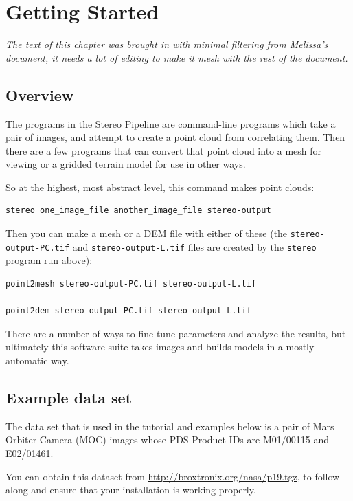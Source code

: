 \chapter{Getting Started}

\emph{The text of this chapter was brought in with minimal filtering from Melissa's document, it needs a lot of editing to make it mesh with the rest of the document.}

\section{Overview}

The programs in the Stereo Pipeline are command-line programs which
take a pair of images, and attempt to create a point cloud from
correlating them.  Then there are a few programs that can convert
that point cloud into a mesh for viewing or a gridded terrain model
for use in other ways.

So at the highest, most abstract level, this command makes point clouds:

\begin{verbatim}
stereo one_image_file another_image_file stereo-output
\end{verbatim}

Then you can make a mesh or a DEM file with either of these (the \texttt{stereo-output-PC.tif} and \texttt{stereo-output-L.tif} files are created by the \texttt{stereo} program run above):

\begin{verbatim}
point2mesh stereo-output-PC.tif stereo-output-L.tif

point2dem stereo-output-PC.tif stereo-output-L.tif
\end{verbatim}

There are a number of ways to fine-tune parameters and
analyze the results, but ultimately this software suite takes images
and builds models in a mostly automatic way.

\section{Example data set}

The data set that is used in the tutorial and examples below is a
pair of Mars Orbiter Camera (MOC)
\citep{1992JGR....97.7699M,2001JGR...10623429M} images whose PDS
Product IDs are M01/00115 and E02/01461.

You can obtain this dataset from \url{http://broxtronix.org/nasa/p19.tgz},
to follow along and ensure that your installation is working properly.

